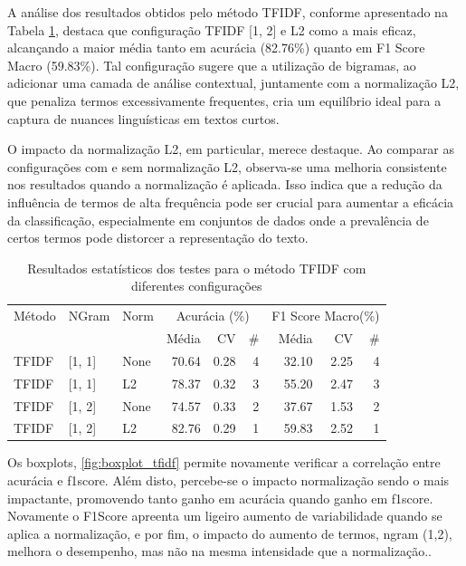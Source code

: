 A análise dos resultados obtidos pelo método TFIDF, conforme apresentado na Tabela \ref{tab:resultadoargmaxtfidf_rankings}, destaca que configuração TFIDF [1, 2] e L2 como a mais eficaz, alcançando a maior média tanto em acurácia (82.76\%) quanto em F1 Score Macro (59.83\%). Tal configuração sugere que a utilização de bigramas, ao adicionar uma camada de análise contextual, juntamente com a normalização L2, que penaliza termos excessivamente frequentes, cria um equilíbrio ideal para a captura de nuances linguísticas em textos curtos.

O impacto da normalização L2, em particular, merece destaque. Ao comparar as configurações com e sem normalização L2, observa-se uma melhoria consistente nos resultados quando a normalização é aplicada. Isso indica que a redução da influência de termos de alta frequência pode ser crucial para aumentar a eficácia da classificação, especialmente em conjuntos de dados onde a prevalência de certos termos pode distorcer a representação do texto.

\begin{table}[H]
\centering
\caption{Resultados estatísticos dos testes para o método TFIDF com diferentes configurações}
\label{tab:resultadoargmaxtfidf_rankings}
\footnotesize %
\begin{tabular}{lllrrrrrr}
\hline
Método & NGram & Norm & \multicolumn{3}{c}{Acurácia (\%)} & \multicolumn{3}{c}{F1 Score Macro(\%)} \\
& & & Média & CV & \# & Média & CV & \# \\
\hline
TFIDF & [1, 1] & None & 70.64 & 0.28 & 4 & 32.10 & 2.25 & 4 \\
TFIDF & [1, 1] & L2 & 78.37 & 0.32 & 3 & 55.20 & 2.47 & 3 \\
TFIDF & [1, 2] & None & 74.57 & 0.33 & 2 & 37.67 & 1.53 & 2 \\
TFIDF & [1, 2] & L2 & 82.76 & 0.29 & 1 & 59.83 & 2.52 & 1 \\
\hline
\end{tabular}
\end{table}

Os boxplots, \ref{fig:boxplot_tfidf} permite novamente verificar a correlação entre acurácia e f1score.  Além disto, percebe-se o impacto normalização sendo o mais impactante, promovendo tanto ganho em acurácia quando ganho em f1score.  Novamente o F1Score apreenta um ligeiro aumento de variabilidade quando se aplica a normalização, e por fim, o impacto do aumento de termos, ngram (1,2), melhora o desempenho, mas não na mesma intensidade que a normalização..


